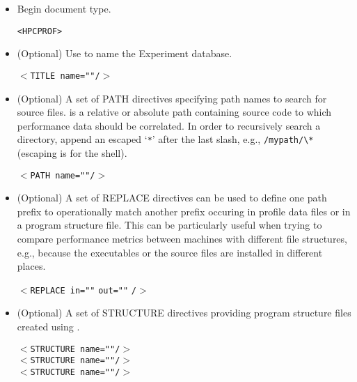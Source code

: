 \documentclass[english]{article}
\begin{document}
\begin{itemize}

\item Begin document type.
  \begin{itemize}
  \verb+<HPCPROF>+
  \end{itemize}

\item (Optional) Use  to name the Experiment database.
  \begin{itemize}
  \texttt{$<$TITLE name="}\texttt{"/$>$}
  \end{itemize}

\item (Optional) A set of PATH directives specifying path names to search for source files.
 is a relative or absolute path containing source code to which performance data should be correlated.
In order to recursively search a directory, append an escaped `\texttt{*}' after the last slash, e.g., \verb+/mypath/\*+ (escaping is for the shell).
  \begin{itemize}
  \texttt{$<$PATH name="}\texttt{"/$>$}
  \end{itemize}

\item (Optional) A set of REPLACE directives can be used to define one path prefix to operationally match another prefix occuring in profile data files or in a program structure file. This can be particularly useful when trying to compare performance metrics between machines with different file structures, e.g., because the executables or the source files are installed in different places.
  \begin{itemize}
  \texttt{$<$REPLACE in="}\texttt{"}
    \texttt{out="}\texttt{"}
      \texttt{/$>$}
  \end{itemize}

\item (Optional) A set of STRUCTURE directives providing program structure files created using .
  \begin{itemize}
  \texttt{$<$STRUCTURE name="}\texttt{"/$>$}\\
  \texttt{$<$STRUCTURE name="}\texttt{"/$>$}\\
  \texttt{$<$STRUCTURE name="}\texttt{"/$>$}\\
  \end{itemize}


\end{itemize}
\end{document}
